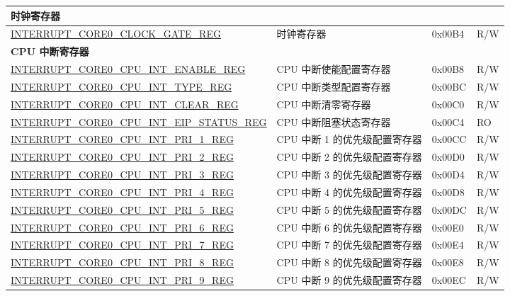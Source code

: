 \begin{longtable}{ | p{10cm} | m{10cm} | m{1.3cm} | m{1.0cm} | }
\multicolumn{4}{|l|}{\textbf{时钟寄存器}} \\ \hline
\hyperref[regdesc:INTERRUPTCORE0CLOCKGATEREG]{INTERRUPT\_CORE0\_CLOCK\_GATE\_REG} & 时钟寄存器 & 0x00B4 & R/W \\ \hline
\multicolumn{4}{|l|}{\textbf{CPU 中断寄存器}} \\ \hline
\hyperref[regdesc:INTERRUPTCORE0CPUINTENABLEREG]{INTERRUPT\_CORE0\_CPU\_INT\_ENABLE\_REG} & CPU 中断使能配置寄存器 & 0x00B8 & R/W \\ \hline
\hyperref[regdesc:INTERRUPTCORE0CPUINTTYPEREG]{INTERRUPT\_CORE0\_CPU\_INT\_TYPE\_REG} & CPU 中断类型配置寄存器 & 0x00BC & R/W \\ \hline
\hyperref[regdesc:INTERRUPTCORE0CPUINTCLEARREG]{INTERRUPT\_CORE0\_CPU\_INT\_CLEAR\_REG} & CPU 中断清零寄存器 & 0x00C0 & R/W \\ \hline
\hyperref[regdesc:INTERRUPTCORE0CPUINTEIPSTATUSREG]{INTERRUPT\_CORE0\_CPU\_INT\_EIP\_STATUS\_REG} & CPU 中断阻塞状态寄存器 & 0x00C4 & RO \\ \hline
\hyperref[regdesc:INTERRUPTCORE0CPUINTPRI0REG]{INTERRUPT\_CORE0\_CPU\_INT\_PRI\_1\_REG} & CPU 中断 1 的优先级配置寄存器 & 0x00CC & R/W \\ \hline
\hyperref[regdesc:INTERRUPTCORE0CPUINTPRI0REG]{INTERRUPT\_CORE0\_CPU\_INT\_PRI\_2\_REG} & CPU 中断 2 的优先级配置寄存器 & 0x00D0 & R/W \\ \hline
\hyperref[regdesc:INTERRUPTCORE0CPUINTPRI0REG]{INTERRUPT\_CORE0\_CPU\_INT\_PRI\_3\_REG} & CPU 中断 3 的优先级配置寄存器 & 0x00D4 & R/W \\ \hline
\hyperref[regdesc:INTERRUPTCORE0CPUINTPRI0REG]{INTERRUPT\_CORE0\_CPU\_INT\_PRI\_4\_REG} & CPU 中断 4 的优先级配置寄存器 & 0x00D8 & R/W \\ \hline
\hyperref[regdesc:INTERRUPTCORE0CPUINTPRI0REG]{INTERRUPT\_CORE0\_CPU\_INT\_PRI\_5\_REG} & CPU 中断 5 的优先级配置寄存器 & 0x00DC & R/W \\ \hline
\hyperref[regdesc:INTERRUPTCORE0CPUINTPRI0REG]{INTERRUPT\_CORE0\_CPU\_INT\_PRI\_6\_REG} & CPU 中断 6 的优先级配置寄存器 & 0x00E0 & R/W \\ \hline
\hyperref[regdesc:INTERRUPTCORE0CPUINTPRI0REG]{INTERRUPT\_CORE0\_CPU\_INT\_PRI\_7\_REG} & CPU 中断 7 的优先级配置寄存器  & 0x00E4 & R/W \\ \hline
\hyperref[regdesc:INTERRUPTCORE0CPUINTPRI0REG]{INTERRUPT\_CORE0\_CPU\_INT\_PRI\_8\_REG} & CPU 中断 8 的优先级配置寄存器 & 0x00E8 & R/W \\ \hline
\hyperref[regdesc:INTERRUPTCORE0CPUINTPRI0REG]{INTERRUPT\_CORE0\_CPU\_INT\_PRI\_9\_REG} & CPU 中断 9 的优先级配置寄存器 & 0x00EC & R/W \\ \hline

\end{longtable}
